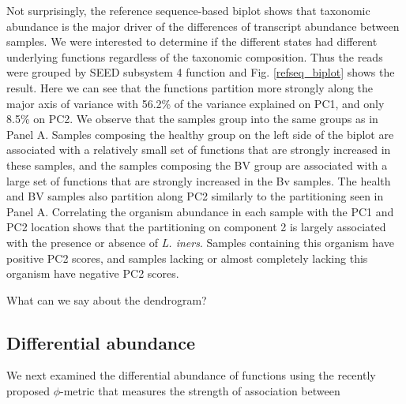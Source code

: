 \documentclass[10pt,letterpaper]{article}
\begin{document}
Not surprisingly, the reference sequence-based biplot shows that taxonomic abundance is the major driver of the differences of transcript abundance between samples. We were interested to determine if the different states had different underlying functions regardless of the taxonomic composition. Thus the reads were grouped by SEED subsystem 4 function and Fig. \ref{refseq_biplot} shows the result.  Here we can see that the functions partition more strongly along the major axis of variance with 56.2\% of the variance explained on PC1, and only 8.5\% on PC2. We observe that the  samples group into the same groups as in Panel A. Samples composing the healthy group on the left side of the biplot are associated with a relatively small set of functions that are strongly increased in these samples, and the samples composing the BV group are associated with a large set of functions that are strongly increased in the Bv samples. The health and BV samples also partition along PC2 similarly to the partitioning seen in Panel A. Correlating the organism abundance in each sample with the PC1 and PC2 location shows that the partitioning on component 2 is largely associated with the presence or absence of \emph{L. iners}. Samples containing this organism have positive PC2 scores, and samples lacking or almost completely lacking this organism have negative PC2 scores. 

What can we say about the dendrogram?

\subsection{Differential abundance}

We next examined the differential abundance of functions using the recently proposed $\phi$-metric that measures the strength of association between 
\end{document}
